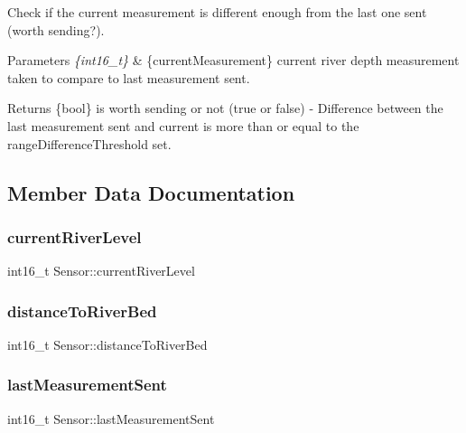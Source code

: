 Check if the current measurement is different enough from the last one sent (worth sending?). 
\begin{DoxyParams}{Parameters}
{\em \{int16\+\_\+t\}} & \{current\+Measurement\} current river depth measurement taken to compare to last measurement sent. \\
\hline
\end{DoxyParams}
\begin{DoxyReturn}{Returns}
\{bool\} is worth sending or not (true or false) -\/ Difference between the last measurement sent and current is more than or equal to the range\+Difference\+Threshold set. 
\end{DoxyReturn}


\subsection{Member Data Documentation}
\mbox{\label{class_sensor_a5276355eb01eb80e9e47f6f793d59f71}} 
\subsubsection{\texorpdfstring{current\+River\+Level}{currentRiverLevel}}
{\footnotesize\ttfamily int16\+\_\+t Sensor\+::current\+River\+Level}

\mbox{\label{class_sensor_a1d3d56b925cb8a8f13c8ad8356b7202a}} 
\subsubsection{\texorpdfstring{distance\+To\+River\+Bed}{distanceToRiverBed}}
{\footnotesize\ttfamily int16\+\_\+t Sensor\+::distance\+To\+River\+Bed}

\mbox{\label{class_sensor_a76b4a42e92d57f14efc76a5f51cdea18}} 
\subsubsection{\texorpdfstring{last\+Measurement\+Sent}{lastMeasurementSent}}
{\footnotesize\ttfamily int16\+\_\+t Sensor\+::last\+Measurement\+Sent}

